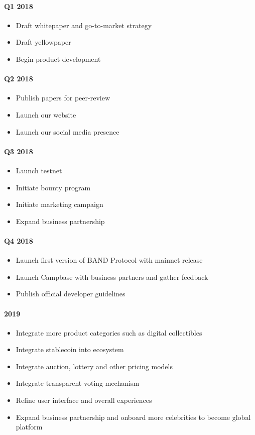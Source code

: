 \documentclass[letterpaper,11pt]{article}
\begin{document}
\paragraph{Q1 2018}
\begin{itemize}
\itemsep0em
\item Draft whitepaper and go-to-market strategy
\item Draft yellowpaper
\item Begin product development
\end{itemize}
\paragraph{Q2 2018}
\begin{itemize}
\itemsep0em
\item Publish papers for peer-review
\item Launch our website
\item Launch our social media presence
\end{itemize}
\paragraph{Q3 2018}
\begin{itemize}
\itemsep0em
\item Launch testnet
\item Initiate bounty program
\item Initiate marketing campaign
\item Expand business partnership
\end{itemize}
\paragraph{Q4 2018}
\begin{itemize}
\itemsep0em
\item Launch first version of BAND Protocol with mainnet release
\item Launch Campbase with business partners and gather feedback
\item Publish official developer guidelines
\end{itemize}
\paragraph{2019}
\begin{itemize}
\itemsep0em
\item Integrate more product categories such as digital collectibles
\item Integrate stablecoin into ecosystem
\item Integrate auction, lottery and other pricing models
\item Integrate transparent voting mechanism
\item Refine user interface and overall experiences
\item Expand business partnership and onboard more celebrities to become global platform
\end{itemize}
\end{document}
